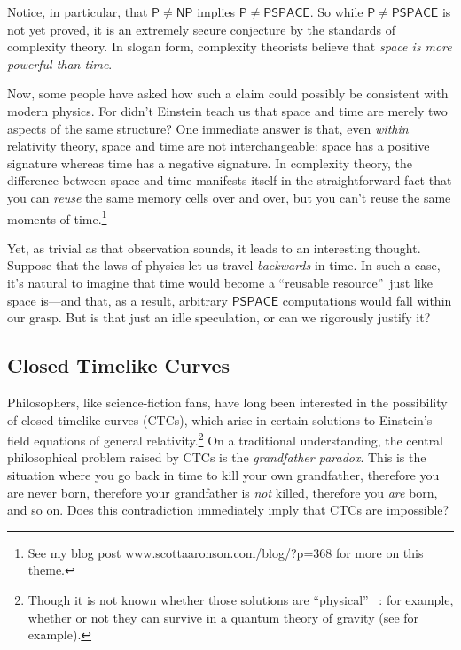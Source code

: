 \documentclass[12pt,onecolumn]{article}%
\begin{document}
Notice, in particular, that $\mathsf{P}\neq\mathsf{NP}$ implies $\mathsf{P\neq
PSPACE}$. So while $\mathsf{P\neq PSPACE}$ is not yet proved, it is an
extremely secure conjecture by the standards of complexity theory. In slogan
form, complexity theorists believe that \textit{space is more powerful than
time}.

Now, some people have asked how such a claim could possibly be consistent with
modern physics. For didn't Einstein teach us that space and time are merely
two aspects of the same structure? One immediate answer is that, even
\textit{within} relativity theory, space and time are not interchangeable:
space has a positive signature whereas time has a negative signature. In
complexity theory, the difference between space and time manifests itself in
the straightforward fact that you can \textit{reuse} the same memory cells
over and over, but you can't reuse the same moments of time.\footnote{See my
blog post www.scottaaronson.com/blog/?p=368 for more on this theme.}

Yet, as trivial as that observation sounds, it leads to an interesting
thought. Suppose that the laws of physics let us travel \textit{backwards
}in time. In such a case, it's natural to imagine that time would become a
\textquotedblleft reusable resource\textquotedblright\  just like space
is---and that, as a result, arbitrary $\mathsf{PSPACE}$ computations would
fall within our grasp. But is that just an idle speculation, or can we
rigorously justify it?

\subsection{Closed Timelike Curves\label{CTC}}

Philosophers, like science-fiction fans, have long been interested in the
possibility of closed timelike curves (CTCs), which arise in certain solutions
to Einstein's field equations of general relativity.\footnote{Though it is not
known whether those solutions are \textquotedblleft physical\textquotedblright\ %
: for example, whether or not they can survive in a quantum theory of gravity
(see \cite{mty} for example).} On a traditional understanding, the central
philosophical problem raised by CTCs is the \textit{grandfather paradox}.
 This is the situation where you go back in time to kill your own
grandfather, therefore you are never born, therefore your grandfather is
\textit{not} killed, therefore you \textit{are} born, and so on. Does this
contradiction immediately imply that CTCs are impossible?
\end{document}
